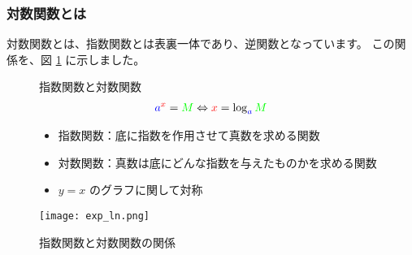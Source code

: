\documentclass[uplatex,dvipdfmx,a4paper,11pt]{jsarticle}
\begin{document}
\subsubsection{対数関数とは}
対数関数とは、指数関数とは表裏一体であり、逆関数となっています。
この関係を、図 \ref{shisuu_taisuu} に示しました。
\begin{figure}[htb]
	\begin{center}
		\begin{minipage}{0.45\textwidth}
			\large
			\begin{itembox}[l]{指数関数と対数関数}
				\vspace{-3mm}
				\begin{align*}
					\textcolor{blue}{a}^{\textcolor{red}{x}} = \textcolor{green}{M} \Leftrightarrow \textcolor{red}{x}= \log_{\textcolor{blue}{a}} \textcolor{green}{M}
				\end{align*}
				\begin{itemize}
					\item 指数関数：底に指数を作用させて真数を求める関数
					\item 対数関数：真数は底にどんな指数を与えたものかを求める関数
					\item $y = x$ のグラフに関して対称
				\end{itemize}
			\end{itembox}
		\end{minipage}
		\begin{minipage}{0.45\textwidth}
			\begin{center}
			\texttt{[image: exp\_ln.png]}
			\end{center}
		\end{minipage}
		\caption{指数関数と対数関数の関係}
		\label{shisuu_taisuu}
	\end{center}
\end{figure}
\end{document}
